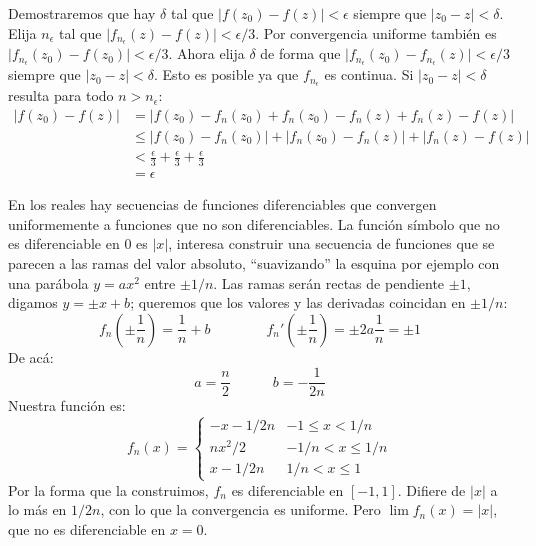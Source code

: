   Demostraremos que hay \(\delta\)
  tal que \(\lvert f(z_0) - f(z) \rvert < \epsilon\)
  siempre que \(\lvert z_0 - z \rvert < \delta\).
  Elija \(n_\epsilon\)
  tal que \(\lvert f_{n_\epsilon}(z) - f(z) \rvert < \epsilon / 3\).
  Por convergencia uniforme
  también es
     \(\lvert f_{n_\epsilon}(z_0) - f(z_0) \rvert < \epsilon / 3\).
  Ahora elija \(\delta\)
  de forma que
    \(\lvert f_{n_\epsilon}(z_0) - f_{n_\epsilon}(z) \rvert
	< \epsilon / 3\)
  siempre que \(\lvert z_0 - z \rvert < \delta\).
  Esto es posible ya que \(f_{n_\epsilon}\) es continua.
  Si \(\lvert z_0 - z \rvert < \delta\) resulta
  para todo \(n > n_\epsilon\):
  \begin{align*}
    \lvert f(z_0) - f(z) \rvert
      &=   \lvert f(z_0) - f_n(z_0)
		    + f_n(z_0) - f_n(z)
		    + f_n(z) - f(z) \rvert \\
      &\le \lvert f(z_0) - f_n(z_0) \rvert
	     + \lvert f_n(z_0) - f_n(z) \rvert
	     + \lvert f_n(z) - f(z) \rvert \\
      &<   \frac{\epsilon}{3}
	     + \frac{\epsilon}{3}
	     + \frac{\epsilon}{3} \\
      &=   \epsilon
  \end{align*}

  En los reales hay secuencias de funciones diferenciables
  que convergen uniformemente a funciones que no son diferenciables.
  La función símbolo que no es diferenciable en \(0\)
  es \(\lvert x \rvert\),
  interesa construir una secuencia de funciones
  que se parecen a las ramas del valor absoluto,
  ``suavizando'' la esquina
  por ejemplo con una parábola \(y = a x^2\)
  entre \(\pm 1 / n\).
  Las ramas serán rectas de pendiente \(\pm 1\),
  digamos \(y = \pm x + b\);
  queremos que los valores
  y las derivadas coincidan en \(\pm 1 / n\):
  \begin{equation*}
    f_n	 \left( \pm \frac{1}{n} \right)
      = \frac{1}{n} + b
    \hspace{4em}
    f_n' \left( \pm \frac{1}{n} \right)
      = \pm 2 a \frac{1}{n}
      = \pm 1
  \end{equation*}
  De acá:
  \begin{equation*}
    a = \frac{n}{2}
    \hspace{3em}
    b = - \frac{1}{2 n}
  \end{equation*}
  Nuestra función es:
  \begin{equation*}
    f_n(x)
      = \begin{cases}
	  - x - 1 / 2 n	      & -1 \le x < 1 / n \\
	  n x^2 / 2	      & - 1 / n < x \le 1 / n \\
	  x - 1 / 2 n	      & 1 / n < x \le 1
	\end{cases}
  \end{equation*}
  Por la forma que la construimos,
  \(f_n\) es diferenciable en \([-1, 1]\).
  Difiere de \(\lvert x \rvert\) a lo más en \(1 / 2 n\),
  con lo que la convergencia es uniforme.
  Pero \(\lim f_n(x) = \lvert x \rvert\),
  que no es diferenciable en \(x = 0\).

